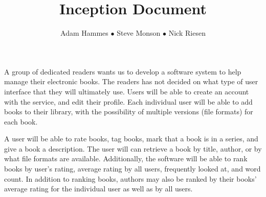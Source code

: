 \documentclass{article}
\title{Inception Document}
\author{Adam Hammes $\bullet$ Steve Monson $\bullet$ Nick Riesen}
\begin{document}
\maketitle

A group of dedicated readers wants us to develop a software system to help manage their electronic books.
The readers has not decided on what type of user interface that they will ultimately use.
Users will be able to create an account with the service, and edit their profile.
Each individual user will be able to add books to their library, with the possibility of multiple versions (file formats) for each book.

A user will be able to rate books, tag books, mark that a book is in a series, and give a book a description.
The user will can retrieve a book by title, author, or by what file formats are available.
Additionally, the software will be able to rank books by user's rating, average rating by all users, frequently looked at, and word count.
In addition to ranking books, authors may also be ranked by their books' average rating for the individual user as well as by all users.
\end{document}
